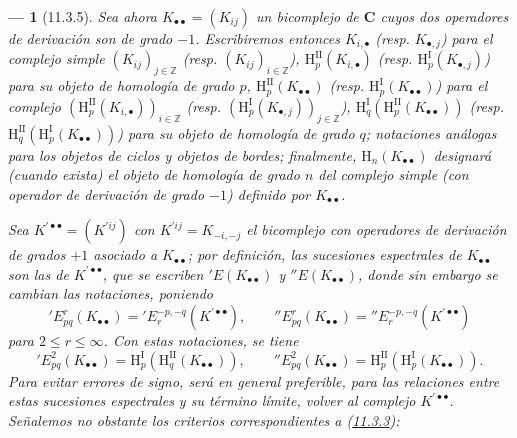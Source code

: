 \documentclass[10pt,oneside,openany]{book}
\theoremstyle{egaenv}\newtheorem*{env}{---}
\theoremstyle{egastatement}
\theoremstyle{egadescription}
\renewcommand{\leq}{\leqslant}
\begin{document}
\begin{env}[11.3.5]
\label{0.11.3.5-fr}
Sea ahora $K_{\bullet\bullet}=(K_{ij})$ un bicomplejo de
$\boldsymbol{C}$ cuyos dos operadores de derivación son de grado $-1$. Escribiremos
entonces $K_{i,\bullet}$ (resp. $K_{\bullet,j}$) para el complejo simple
$(K_{ij})_{j\in\mathbb Z}$ (resp. $(K_{ij})_{i\in\mathbb Z}$),
$\mathrm H_p^{\mathrm{II}}(K_{i,\bullet})$ (resp.
$\mathrm H_p^{\mathrm I}(K_{\bullet,j})$) para su objeto de homología de grado $p$,
$\mathrm H_p^{\mathrm{II}}(K_{\bullet\bullet})$ (resp.
$\mathrm H_p^{\mathrm I}(K_{\bullet\bullet})$) para el complejo
$(\mathrm H_p^{\mathrm{II}}(K_{i,\bullet}))_{i\in\mathbb Z}$ (resp.
$(\mathrm H_p^{\mathrm I}(K_{\bullet,j}))_{j\in\mathbb Z}$),
$\mathrm H_q^{\mathrm I}(\mathrm H_p^{\mathrm{II}}(K_{\bullet\bullet}))$
(resp.
$\mathrm H_q^{\mathrm{II}}(\mathrm H_p^{\mathrm I}(K_{\bullet\bullet}))$)
para su objeto de homología de grado $q$; notaciones análogas para los objetos de ciclos
y objetos de bordes; finalmente, $\mathrm H_n(K_{\bullet\bullet})$ designará
(cuando exista) el objeto de homología de grado $n$ del complejo simple (con
operador de derivación de grado $-1$) definido por $K_{\bullet\bullet}$.

Sea $K^{\prime\bullet\bullet}=(K^{\prime ij})$ con
$K^{\prime ij}=K_{-i,-j}$ el bicomplejo con operadores de derivación de grados
$+1$ asociado a $K_{\bullet\bullet}$; por definición, las
\emph{sucesiones espectrales} de $K_{\bullet\bullet}$ son las de
$K^{\prime\bullet\bullet}$, que se escriben $'E(K_{\bullet\bullet})$ y
$''E(K_{\bullet\bullet})$, donde sin embargo se cambian las notaciones, poniendo
\[
  'E_{pq}^r(K_{\bullet\bullet})
  ='E_r^{-p,-q}(K^{\prime\bullet\bullet}),\qquad
  ''E_{pq}^r(K_{\bullet\bullet})
  =''E_r^{-p,-q}(K^{\prime\bullet\bullet})
\]
para $2\leq r\leq\infty$. Con estas notaciones, se tiene
\[
  'E_{pq}^2(K_{\bullet\bullet})
  =\mathrm H_p^{\mathrm I}(\mathrm H_q^{\mathrm{II}}(K_{\bullet\bullet})),
  \qquad
  ''E_{pq}^2(K_{\bullet\bullet})
  =\mathrm H_p^{\mathrm{II}}(\mathrm H_p^{\mathrm I}(K_{\bullet\bullet})).
\]
Para evitar errores de signo, será en general preferible, para las
relaciones entre estas sucesiones espectrales y su término límite, volver al
complejo $K^{\prime\bullet\bullet}$. Señalemos no obstante los criterios
correspondientes a (\hyperref[0.11.3.3-fr]{11.3.3}):
\end{env}
\end{document}
